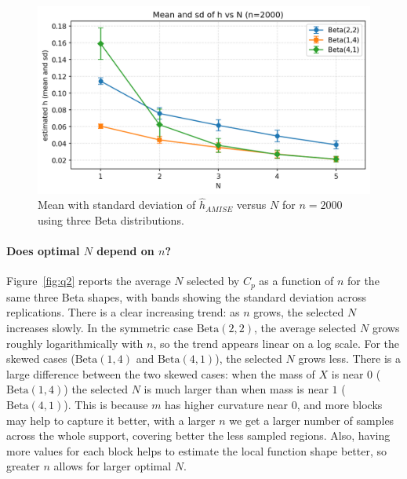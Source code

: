\documentclass[11pt]{article}
\begin{document}
\begin{figure}[h]
\centering
\includegraphics[width=.85\linewidth]{output/h_vs_N_mean.png}
\caption{Mean with standard deviation of \(\hat h_{AMISE}\) versus \(N\) for \(n=2000\) using three Beta distributions.}
\label{fig:q1}
\end{figure}
\FloatBarrier

\paragraph{Does optimal \(N\) depend on \(n\)?}
Figure~\ref{fig:q2} reports the average \(N\) selected by \(C_p\) as a function of \(n\) for the same three Beta shapes, with bands showing the standard deviation across replications.
There is a clear increasing trend: as \(n\) grows, the selected \(N\) increases slowly.
In the symmetric case \(\mathrm{Beta}(2,2)\), the average selected \(N\) grows roughly logarithmically with \(n\), so the trend appears linear on a log scale.
For the skewed cases (\(\mathrm{Beta}(1,4)\) and \(\mathrm{Beta}(4,1)\)), the selected \(N\) grows less.
There is a large difference between the two skewed cases: when the mass of \(X\) is near \(0\) (\(\mathrm{Beta}(1,4)\)) the selected \(N\) is much larger than when mass is near \(1\) (\(\mathrm{Beta}(4,1)\)).
This is because \(m\) has higher curvature near \(0\), and more blocks may help to capture it better, with a larger \(n\) we get a larger number of samples across the whole support, covering better the less sampled regions.
Also, having more values for each block helps to estimate the local function shape better, so greater \(n\) allows for larger optimal \(N\).
\end{document}
